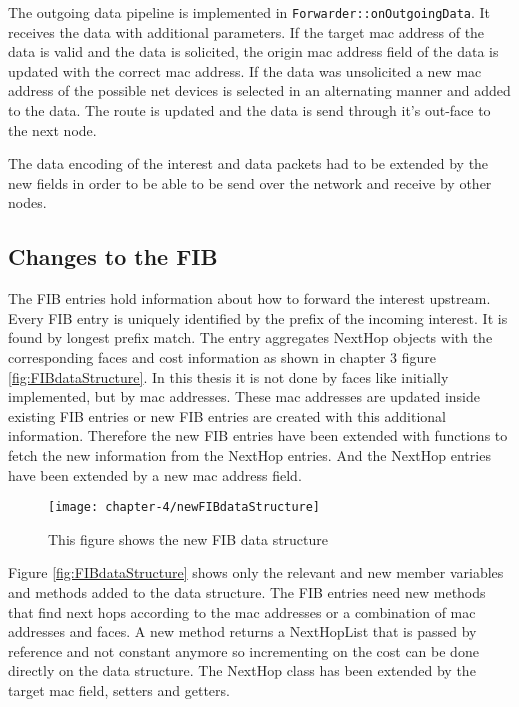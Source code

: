 The outgoing data pipeline is implemented in \texttt{Forwarder::onOutgoingData}. It receives the data with additional parameters. If the target mac address of the data is valid and the data is solicited, the origin mac address field of the data is updated with the correct mac address. If the data was unsolicited a new mac address of the possible net devices is selected in an alternating manner and added to the data. The route is updated and the data is send through it's out-face to the next node.

The data encoding of the interest and data packets had to be extended by the new fields in order to be able to be send over the network and receive by other nodes.

\subsection{Changes to the FIB}

The FIB entries hold information about how to forward the interest upstream. Every FIB entry is uniquely identified by the prefix of the incoming interest. It is found by longest prefix match. The entry aggregates NextHop objects with the corresponding faces and cost information as shown in chapter 3 figure \ref{fig:FIBdataStructure}.
In this thesis it is not done by faces like initially implemented, but by mac addresses. These mac addresses are updated inside existing FIB entries or new FIB entries are created with this additional information. Therefore the new FIB entries have been extended with functions to fetch the new information from the NextHop entries. And the NextHop entries have been extended by a new mac address field.

\begin{figure}[H]
  \centering
  \texttt{[image: chapter-4/newFIBdataStructure]}
  \caption{This figure shows the new FIB data structure}
  \label{fig:newFIBdataStructure}
\end{figure}

Figure \ref{fig:FIBdataStructure} shows only the relevant and new member variables and methods added to the data structure. The FIB entries need new methods that find next hops according to the mac addresses or a combination of mac addresses and faces. A new method returns a NextHopList that is passed by reference and not constant anymore so incrementing on the cost can be done directly on the data structure. The NextHop class has been extended by the target mac field, setters and getters.

